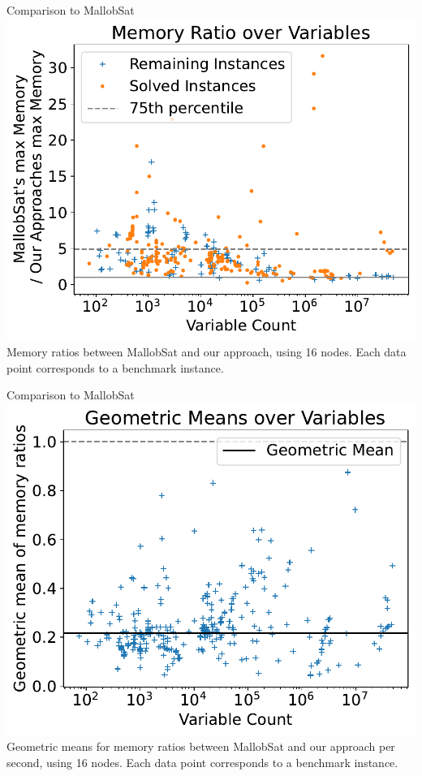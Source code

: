 \documentclass{beamer}
\begin{document}
\begin{frame}{Comparison to MallobSat}
    \center
    \includegraphics[scale=.45]{plots/16node_compare/mem_ratio_over_vars.pdf}\\
    Memory ratios between MallobSat and our approach, using 16 nodes. Each data point corresponds to a benchmark instance.
\end{frame}

\begin{frame}{Comparison to MallobSat}
    \center
    \includegraphics[scale=.425]{plots/16node_compare/mem_gm_over_vars.pdf}\\
    Geometric means for memory ratios between MallobSat and our approach per second, using 16 nodes. Each data point corresponds to a benchmark instance.
\end{frame}
\end{document}
